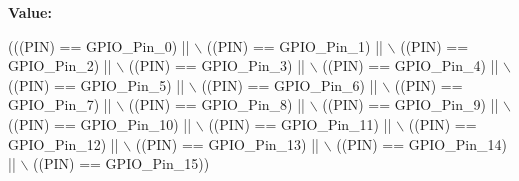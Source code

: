 {\bfseries Value\+:}
\begin{DoxyCode}
(((PIN) == GPIO\_Pin\_0) || \(\backslash\)
                              ((PIN) == GPIO\_Pin\_1) || \(\backslash\)
                              ((PIN) == GPIO\_Pin\_2) || \(\backslash\)
                              ((PIN) == GPIO\_Pin\_3) || \(\backslash\)
                              ((PIN) == GPIO\_Pin\_4) || \(\backslash\)
                              ((PIN) == GPIO\_Pin\_5) || \(\backslash\)
                              ((PIN) == GPIO\_Pin\_6) || \(\backslash\)
                              ((PIN) == GPIO\_Pin\_7) || \(\backslash\)
                              ((PIN) == GPIO\_Pin\_8) || \(\backslash\)
                              ((PIN) == GPIO\_Pin\_9) || \(\backslash\)
                              ((PIN) == GPIO\_Pin\_10) || \(\backslash\)
                              ((PIN) == GPIO\_Pin\_11) || \(\backslash\)
                              ((PIN) == GPIO\_Pin\_12) || \(\backslash\)
                              ((PIN) == GPIO\_Pin\_13) || \(\backslash\)
                              ((PIN) == GPIO\_Pin\_14) || \(\backslash\)
                              ((PIN) == GPIO\_Pin\_15))
\end{DoxyCode}
